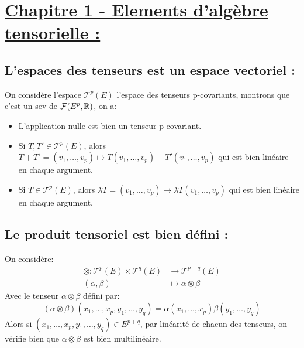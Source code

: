 \section*{\uline{Chapitre 1 - Elements d'algèbre tensorielle {:}}}
   \subsection*{L'espaces des tenseurs est un espace vectoriel {:}}
      On considère l'espace \( \mathscr{T}^p(E) \) l'espace des tenseurs p-covariants, montrons que c'est un sev de \( \mathcal{F}(E^p, \mathbb{R}) \), on a:
      \begin{itemize}
         \item L'application nulle est bien un tenseur p-covariant.
         \item Si \( T, T' \in \mathscr{T}^p(E)\), alors \( T + T' = (v_1, \ldots, v_p) \mapsto T(v_1, \ldots, v_p) + T'(v_1, \ldots, v_p) \) qui est bien linéaire en chaque argument.
         \item Si \( T \in \mathscr{T}^p(E)\), alors \( \lambda T = (v_1, \ldots, v_p) \mapsto \lambda T(v_1, \ldots, v_p) \) qui est bien linéaire en chaque argument.
      \end{itemize}
   \subsection*{Le produit tensoriel est bien défini {:}}
On considère: 
\begin{align*}
   \otimes : \mathscr{T}^p(E) \times \mathscr{T}^q(E) &\longrightarrow \mathscr{T}^{p+q}(E)\\
   (\alpha, \beta) &\longmapsto \alpha \otimes \beta
\end{align*}
Avec le tenseur \(\alpha \otimes \beta\) défini par:
\[
   (\alpha \otimes \beta)(x_1, \ldots, x_p, y_1, \ldots, y_q) = \alpha(x_1, \ldots, x_p)\beta(y_1, \ldots, y_q)
\]
Alors si \( (x_1, \ldots, x_p, y_1, \ldots, y_q) \in E^{p+q} \), par linéarité de chacun des tenseurs, on vérifie bien que \( \alpha \otimes \beta \) est bien multilinéaire.
